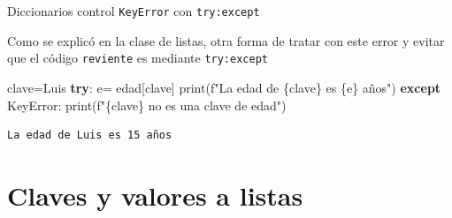 \documentclass[
  ignorenonframetext,
  aspectratio=169,
  spanish,
]{beamer}
\newenvironment{Shaded}{\begin{snugshade}}{\end{snugshade}}
\newcommand{\BuiltInTok}[1]{\textcolor[rgb]{0.00,0.23,0.31}{#1}}
\newcommand{\ControlFlowTok}[1]{\textcolor[rgb]{0.00,0.23,0.31}{\textbf{#1}}}
\newcommand{\NormalTok}[1]{\textcolor[rgb]{0.00,0.23,0.31}{#1}}
\newcommand{\OperatorTok}[1]{\textcolor[rgb]{0.37,0.37,0.37}{#1}}
\newcommand{\PreprocessorTok}[1]{\textcolor[rgb]{0.68,0.00,0.00}{#1}}
\newcommand{\SpecialCharTok}[1]{\textcolor[rgb]{0.37,0.37,0.37}{#1}}
\newcommand{\SpecialStringTok}[1]{\textcolor[rgb]{0.13,0.47,0.30}{#1}}
\newcommand{\StringTok}[1]{\textcolor[rgb]{0.13,0.47,0.30}{#1}}
\begin{document}
\begin{frame}[fragile]{Diccionarios control \texttt{KeyError} con
\texttt{try:except}}
\label{diccionarios-control-keyerror-con-tryexcept}
\begin{tcolorbox}[enhanced jigsaw, leftrule=.75mm, titlerule=0mm, bottomrule=.15mm, opacitybacktitle=0.6, colbacktitle=quarto-callout-tip-color!10!white, arc=.35mm, colframe=quarto-callout-tip-color-frame, bottomtitle=1mm, title=\textcolor{quarto-callout-tip-color}{\faLightbulb}\hspace{0.5em}{Tip}, coltitle=black, colback=white, toptitle=1mm, rightrule=.15mm, breakable, toprule=.15mm, left=2mm, opacityback=0]

Como se explicó en la clase de listas, otra forma de tratar con este
error y evitar que el código \texttt{reviente} es mediante
\texttt{try:except}

\begin{Shaded}
\begin{Highlighting}[]
\NormalTok{clave}\OperatorTok{=}\StringTok{\textquotesingle{}Luis\textquotesingle{}}
\ControlFlowTok{try}\NormalTok{:}
\NormalTok{    e}\OperatorTok{=}\NormalTok{ edad[clave]}
    \BuiltInTok{print}\NormalTok{(}\SpecialStringTok{f"La edad de }\SpecialCharTok{\{}\NormalTok{clave}\SpecialCharTok{\}}\SpecialStringTok{ es }\SpecialCharTok{\{}\NormalTok{e}\SpecialCharTok{\}}\SpecialStringTok{ años"}\NormalTok{) }
\ControlFlowTok{except} \PreprocessorTok{KeyError}\NormalTok{:}
    \BuiltInTok{print}\NormalTok{(}\SpecialStringTok{f"}\SpecialCharTok{\{}\NormalTok{clave}\SpecialCharTok{\}}\SpecialStringTok{ no es una clave de edad"}\NormalTok{)}
\end{Highlighting}
\end{Shaded}

\begin{verbatim}
La edad de Luis es 15 años
\end{verbatim}

\end{tcolorbox}
\end{frame}

\section{Claves y valores a listas}\label{claves-y-valores-a-listas}
\end{document}
